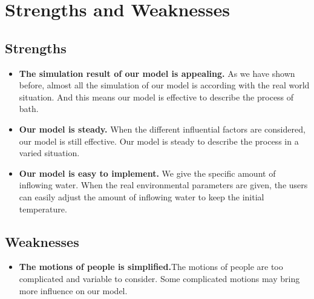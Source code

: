 \documentclass{mcmthesis}
\begin{document}
\section{Strengths and Weaknesses}
\subsection{Strengths}
\begin{itemize}
\item{\textbf{The simulation result of our model is appealing.} As we have shown before, almost all the simulation of our model is according with the real world situation. And this means our model is effective to describe the process of bath.}
\item{\textbf{Our model is steady.} When the different influential factors are considered, our model is still effective. Our model is steady to describe the process in a varied situation. }
\item{\textbf{Our model is easy to implement.} We give the specific amount of inflowing water. When the real environmental parameters are given, the users can easily adjust the amount of inflowing water to keep the initial temperature. }
\end{itemize}
\subsection{Weaknesses}
\begin{itemize}
\item{\textbf{The motions of people is simplified.}The motions of people are too complicated and variable to consider. Some complicated motions may bring more influence on our model. }
\end{itemize}
\end{document}
